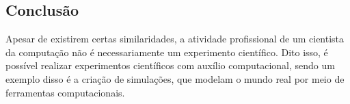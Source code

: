 \subsection{Conclusão}

Apesar de existirem certas similaridades, a atividade profissional de um cientista da
computação não é necessariamente um experimento científico. Dito isso, é possível realizar
experimentos científicos com auxílio computacional, sendo um exemplo disso é a criação de
simulações, que modelam o mundo real por meio de ferramentas computacionais.

